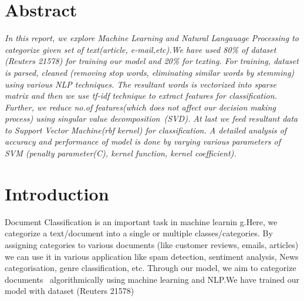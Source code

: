 \documentclass{report}
\begin{document}
\begin{multicols}{2}
\section{\Huge Abstract}
\par \Large \textit{{In this report, we explore Machine Learning and Natural Langauage Processing to categorize given set of text(article, e-mail,etc).We have used 80\% of dataset (Reuters 21578) for training our model and 20\% for texting. For training, dataset is parsed, cleaned (removing stop words, eliminating similar words by stemming) using various NLP techniques. The resultant words is vectorized into sparse matrix and then we use tf-idf technique to extract features for classification. Further, we reduce no.of features(which does not affect our decision making process) using singular value decomposition (SVD). At last we feed resultant data to Support Vector Machine(rbf kernel) for classification. A detailed analysis of accuracy and performance of model is done by varying various parameters of SVM (penalty parameter(C), kernel function, kernel coefficient).}}
\section{\Huge Introduction}

\par \Large Document Classification is an important task in machine learnin g.Here, we categorize a text/document into a single or multiple classes/categories.
By assigning categories to various documents (like customer reviews, emails, articles) we can use it in various application like spam detection, sentiment analysis, News categorisation, genre classification, etc.
Through our model, we aim to  categorize documents  algorithmically using machine learning and NLP.We have trained our model with dataset (Reuters 21578)

\end{multicols}
\end{document}
